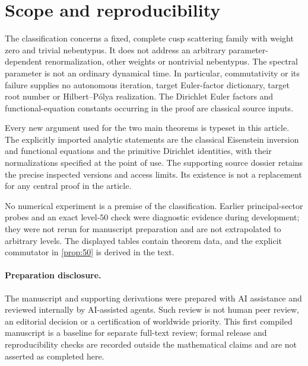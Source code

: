 \section{Scope and reproducibility}\label{sec:scope}

The classification concerns a fixed, complete cusp scattering
family with weight zero and trivial nebentypus. It does not
address an arbitrary parameter-dependent renormalization,
other weights or nontrivial nebentypus. The spectral parameter
is not an ordinary dynamical time. In particular, commutativity
or its failure supplies no autonomous iteration, target
Euler-factor dictionary, target root number or
Hilbert--P\'olya realization. The Dirichlet Euler factors and
functional-equation constants occurring in the proof are
classical source inputs.

Every new argument used for the two main theorems is typeset
in this article. The explicitly imported analytic statements
are the classical Eisenstein inversion and functional
equations and the primitive Dirichlet identities, with their
normalizations specified at the point of use. The supporting
source dossier retains the precise inspected versions and
access limits. Its existence is not a replacement for any
central proof in the article.

No numerical experiment is a premise of the classification.
Earlier principal-sector probes and an exact level-\(50\)
check were diagnostic evidence during development; they
were not rerun for manuscript preparation and are not
extrapolated to arbitrary levels. The displayed tables
contain theorem data, and the explicit commutator in
\cref{prop:50} is derived in the text.

\paragraph{Preparation disclosure.}
The manuscript and supporting derivations were prepared with
AI assistance and reviewed internally by AI-assisted agents.
Such review is not human peer review, an editorial decision
or a certification of worldwide priority. This first compiled
manuscript is a baseline for separate full-text review;
formal release and reproducibility checks are recorded outside
the mathematical claims and are not asserted as completed here.
